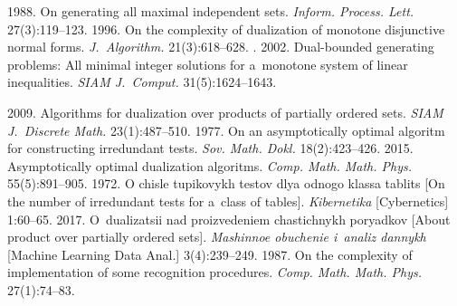   \begin{multicols}{2}

\renewcommand{\bibname}{\protect\rmfamily References}

{\small\frenchspacing
 {%
 \begin{thebibliography}{9}
     1988. On 
generating all maximal independent sets. \textit{Inform. Process. Lett.} 27(3):119--123.
     1996. On the complexity of dualization 
of monotone disjunctive normal forms. \textit{J.~Algorithm.} 21(3):618--628.
    . 
2002. Dual-bounded generating problems: All
 minimal integer solutions for 
a~monotone system of linear inequalities. \textit{SIAM J.~Comput.}  
31(5):1624--1643. 
{

}
     2009. Algorithms for dualization over products of partially 
ordered sets. \textit{SIAM J.~Discrete Math.} 23(1):487--510. 
     1977. On an asymptotically optimal algoritm for 
constructing irredundant tests. \textit{Sov. Math. Dokl.} 18(2):423--426.
     2015. Asymptotically optimal 
dualization algoritms. \textit{Comp. Math. Math. Phys.} 55(5):891--905.
     1972. O chisle tupikovykh testov dlya 
odnogo klassa tablits [On the number of irredundant tests for a~class of tables]. 
\textit{Kibernetika} [Cybernetics] 1:60--65.
     2017. O~dua\-li\-za\-tsii nad 
proizvedeniem chastichnykh poryadkov [About product over partially ordered sets]. 
\textit{Mashinnoe obuchenie i~analiz dannykh} [Machine Learning Data Anal.] 
3(4):239--249. 
     1987. On the complexity of implementation of some 
recognition procedures. \textit{Comp. Math. Math. Phys.} 27(1):74--83. 
\end{thebibliography}

 }
 }

\end{multicols}

\vspace*{-6pt}

